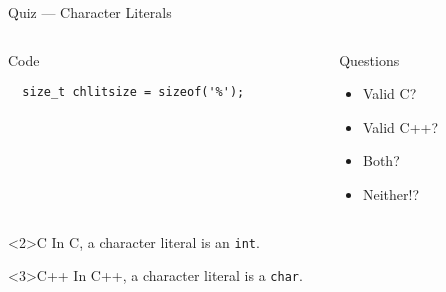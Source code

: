 \documentclass[presentation,aspectratio=169]{beamer}
\begin{document}
\begin{frame}[fragile,label={sec:org23c4234}]{Quiz — Character Literals}
 \begin{columns}
\begin{column}{0.48\columnwidth}
\begin{block}{Code}
\begin{verbatim}
  size_t chlitsize = sizeof('%');
\end{verbatim}
\end{block}
\end{column}

\begin{column}{0.48\columnwidth}
\begin{block}{Questions}
\begin{itemize}
\item Valid C?
\item Valid C++?
\item Both?
\item Neither!?
\end{itemize}
\end{block}
\end{column}
\end{columns}

\begin{block}<2>{C}
In C, a character literal is an \texttt{int}.
\end{block}

\vspace{-1cm}
\begin{block}<3>{C++}
In C++, a character literal is a \texttt{char}.
\end{block}
\end{frame}

\end{document}
